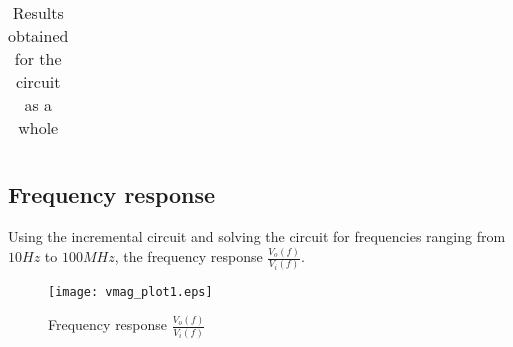 \begin{table}[H]
  \centering
  \begin{tabular}{|c|c|}
    \hline
      
  \end{tabular}
  \caption{Results obtained for the circuit as a whole}
  \label{tab:resultsAC2}
\end{table}


\subsection{Frequency response}
Using the incremental circuit and solving the circuit for frequencies ranging from $10 Hz$ to $100 MHz$, the frequency response $\frac{V_o(f)}{V_i(f)}$.

\begin{figure}[H] \centering
\texttt{[image: vmag\_plot1.eps]}
\caption{Frequency response $\frac{V_o(f)}{V_i(f)}$}
\label{fig:freq_response}
\end{figure}







